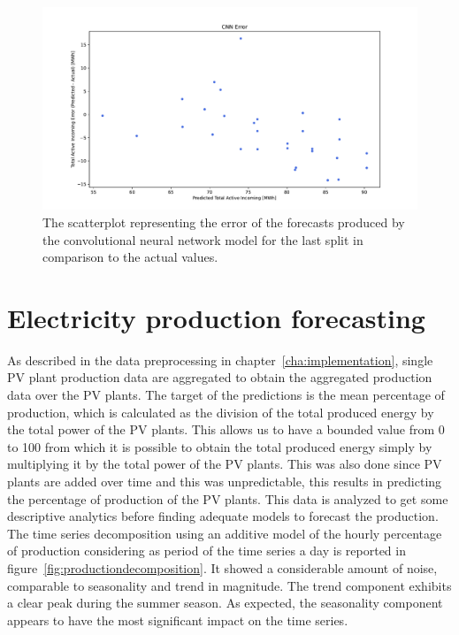 \begin{figure}[H]
\centering
\includegraphics[width=1\textwidth]{images/demand/CNN_error_scatter_plot_predicted_daily_aggregated}
\caption{The scatterplot representing the error of the forecasts produced by the convolutional neural network model for the last split in comparison to the actual values.}
\label{fig:demandcnndailyforecastsscatterplot}
\end{figure}



\section{Electricity production forecasting}
\label{sec:productionval}
\vspace{0.2 cm}

As described in the data preprocessing in chapter~\ref{cha:implementation}, single PV plant production data are aggregated to obtain the aggregated production data over the PV plants.
The target of the predictions is the mean percentage of production, which is calculated as the division of the total produced energy by the total power of the PV plants.
This allows us to have a bounded value from 0 to 100 from which it is possible to obtain the total produced energy simply by multiplying it by the total power of the PV plants.
This was also done since PV plants are added over time and this was unpredictable, this results in predicting the percentage of production of the PV plants.
This data is analyzed to get some descriptive analytics before finding adequate models to forecast the production.
The time series decomposition using an additive model of the hourly percentage of production considering as period of the time series a day is reported in figure~\ref{fig:productiondecomposition}.
It showed a considerable amount of noise, comparable to seasonality and trend in magnitude.
The trend component exhibits a clear peak during the summer season.
As expected, the seasonality component appears to have the most significant impact on the time series.

